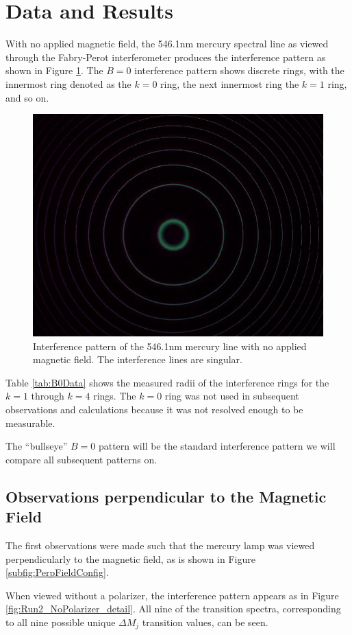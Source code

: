 \documentclass[twocolumn]{article}
\begin{document}
\section{Data and Results} \label{sec:DataAndResults}
	 
	 With no applied magnetic field, the 546.1nm mercury spectral line as viewed through the Fabry-Perot interferometer produces the interference pattern as shown in Figure \ref{fig:B=0Pattern}.
	 The $B=0$ interference pattern shows discrete rings, with the innermost ring denoted as the $k=0$ ring, the next innermost ring the $k=1$ ring, and so on.
	 
	 \begin{figure}
	 	\centering
	 	\includegraphics[width=0.65\linewidth]{Images/B=0Pattern}
	 	\caption{Interference pattern of the 546.1nm mercury line with no applied magnetic field. The interference lines are singular.}
	 	\label{fig:B=0Pattern}
	 \end{figure}
	 
	 Table \ref{tab:B0Data} shows the measured radii of the interference rings for the $k=1$ through $k=4$ rings.
	 The $k=0$ ring was not used in subsequent observations and calculations because it was not resolved enough to be measurable.
	 
	 The ``bullseye'' $B=0$ pattern will be the standard interference pattern we will compare all subsequent patterns on.
	 
	\subsection{Observations perpendicular to the Magnetic Field}
		The first observations were made such that the mercury lamp was viewed perpendicularly to the magnetic field, as is shown in Figure \ref{subfig:PerpFieldConfig}.
		
		When viewed without a polarizer, the interference pattern appears as in Figure \ref{fig:Run2_NoPolarizer_detail}.
		All nine of the transition spectra, corresponding to all nine possible unique $\Delta M_j$ transition values, can be seen.
		
\end{document}
